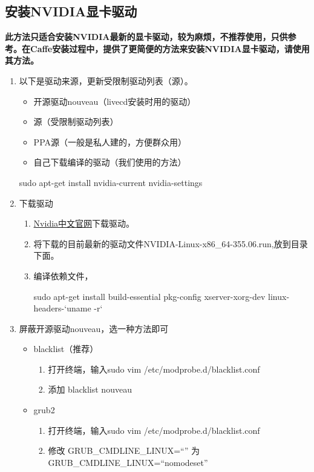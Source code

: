 \subsection{安装NVIDIA显卡驱动}
\textbf{此方法只适合安装NVIDIA最新的显卡驱动，较为麻烦，不推荐使用，只供参考。在Caffe安装过程中，提供了更简便的方法来安装NVIDIA显卡驱动，请使用其方法。}
\begin{enumerate}
\item 以下是驱动来源，更新受限制驱动列表（源）。
\begin{itemize}
\item 开源驱动nouveau（livecd安装时用的驱动）
\item 源（受限制驱动列表）
\item PPA源（一般是私人建的，方便群众用）
\item 自己下载编译的驱动（我们使用的方法）
\end{itemize}
\begin{bash}
sudo apt-get install nvidia-current nvidia-settings
\end{bash}
\item 下载驱动
	\begin{enumerate}
	\item \href{http://www.nvidia.cn/page/home.html}{Nvidia中文官网}下载驱动。
	\item 将下载的目前最新的驱动文件NVIDIA-Linux-x86\_64-355.06.run,放到{\color{blue}{/home/用户名/}}目录下面。
	\item 编译依赖文件，
	\begin{bash}
	sudo apt-get install build-essential pkg-config xserver-xorg-dev linux-headers-`uname -r`
	\end{bash}
	\end{enumerate}
\item 屏蔽开源驱动nouveau，选一种方法即可
	\begin{itemize}
	\item blacklist（推荐）
	    \begin{enumerate}
	    \item 打开终端，输入sudo vim /etc/modprobe.d/blacklist.conf
	    \item 添加 blacklist nouveau
	    \end{enumerate}
	\item grub2
	    \begin{enumerate}
	    \item 打开终端，输入sudo vim /etc/modprobe.d/blacklist.conf
	    \item 修改 GRUB\_CMDLINE\_LINUX=``'' 为 GRUB\_CMDLINE\_LINUX=``nomodeset''

\end{enumerate}
\end{itemize}
\end{enumerate}
